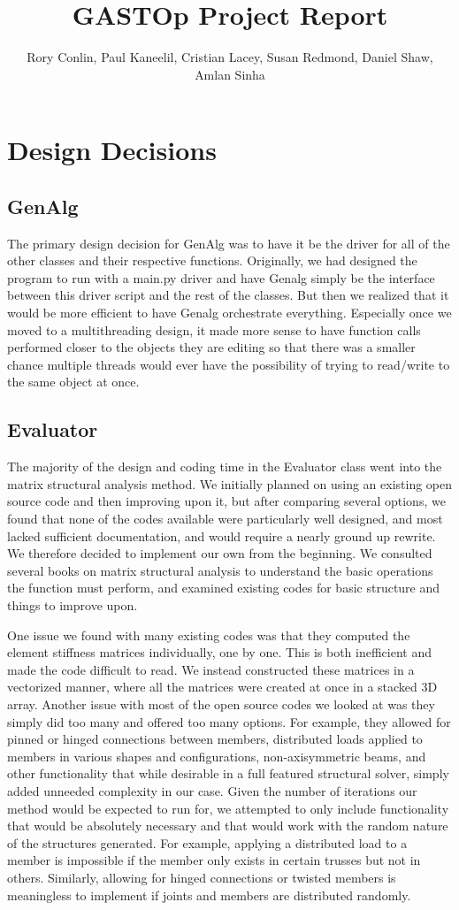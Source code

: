 \documentclass{article}
\title{GASTOp Project Report}
\author{Rory Conlin, Paul Kaneelil, Cristian Lacey, Susan Redmond, Daniel Shaw, Amlan Sinha}
\begin{document}
\maketitle
\section{Design Decisions}
\subsection{GenAlg}
The primary design decision for GenAlg was to have it be the driver for all of
the other classes and their respective functions. Originally, we had designed
the program to run with a main.py driver and have Genalg simply be the interface
between this driver script and the rest of the classes. But then we realized
that it would be more efficient to have Genalg orchestrate everything.
Especially once we moved to a multithreading design, it made more sense to have
function calls performed closer to the objects they are editing so that there
was a smaller chance multiple threads would ever have the possibility of trying
to read/write to the same object at once.
\subsection{Evaluator}
The majority of the design and coding time in the Evaluator class went into the matrix
structural analysis method. We initially planned on using an existing open source code and
then improving upon it, but after comparing several options, we found that none of the codes
available were particularly well designed, and most lacked sufficient documentation,
and would require a nearly ground up rewrite. We therefore decided to implement our own from
the beginning. We consulted several books on matrix structural analysis to understand the
basic operations the function must perform, and examined existing codes for basic structure
and things to improve upon.

One issue we found with many existing codes was that they computed the element stiffness matrices
individually, one by one. This is both inefficient and made the code difficult to read. We instead
constructed these matrices in a vectorized manner, where all the matrices were created at once in a stacked
3D array. Another issue with most of the open source codes we looked at was they simply did too many and
offered too many options. For example, they allowed for pinned or hinged connections between members,
distributed loads applied to members in various shapes and configurations, non-axisymmetric beams, and other
functionality that while desirable in a full featured structural solver, simply added unneeded complexity in
our case. Given the number of iterations our method would be expected to run for, we attempted to only include
functionality that would be absolutely necessary and that would work with the random nature of the structures generated.
For example, applying a distributed load to a member is impossible if the member only exists in certain trusses but not in others.
Similarly, allowing for hinged connections or twisted members is meaningless to implement if joints and members are distributed randomly.
\end{document}
